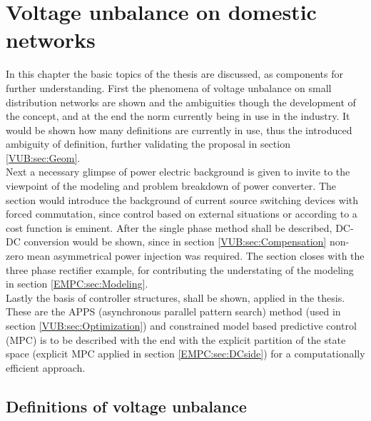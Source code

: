 \chapter{Voltage unbalance on domestic networks}\label{BASIC:sec:main}

In this chapter the basic topics of the thesis are discussed, as components for further understanding. First the phenomena of voltage unbalance on small distribution networks are shown and the ambiguities though the development of the concept, and at the end the norm currently being in use in the industry. It would be shown how many definitions are currently in use, thus the introduced ambiguity of definition, further validating the proposal in section \ref{VUB:sec:Geom}.\\
Next a necessary glimpse of power electric background is given to invite to the viewpoint of the modeling and problem breakdown of power converter. The section would introduce the background of current source switching devices with forced commutation, since control based on external situations or according to a cost function is eminent. After the single phase method shall be described, DC-DC conversion would be shown, since in section \ref{VUB:sec:Compensation} non-zero mean asymmetrical power injection was required. The section closes with the three phase rectifier example, for contributing the understating of the modeling in section \ref{EMPC:sec:Modeling}.\\
Lastly the basis of controller structures, shall be shown, applied in the thesis. These are the APPS (asynchronous parallel pattern search) method (used in section \ref{VUB:sec:Optimization}) and constrained model based predictive control (MPC) is to be described with the end with the explicit partition of the state space (explicit MPC applied in section \ref{EMPC:sec:DCside}) for a computationally efficient approach.

	\section{Definitions of voltage unbalance}\label{BASICUNB:sec:DefinitionsofUNB}

